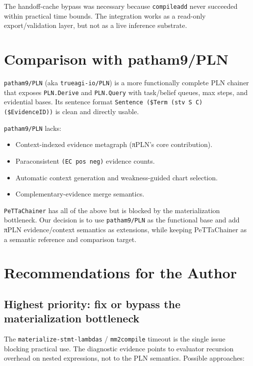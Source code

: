 \documentclass[11pt]{article}
\begin{document}
The handoff-cache bypass was necessary because \texttt{compileadd} never
succeeded within practical time bounds. The integration works as a read-only
export/validation layer, but not as a live inference substrate.


\section{Comparison with patham9/PLN}

\texttt{patham9/PLN} (aka \texttt{trueagi-io/PLN}) is a more functionally complete
PLN chainer that exposes \texttt{PLN.Derive} and \texttt{PLN.Query} with task/belief
queues, max steps, and evidential bases. Its sentence format
\texttt{Sentence (\$Term (stv S C) (\$EvidenceID))} is clean and directly usable.

\texttt{patham9/PLN} lacks:
\begin{itemize}[nosep]
  \item Context-indexed evidence metagraph (πPLN's core contribution).
  \item Paraconsistent \texttt{(EC pos neg)} evidence counts.
  \item Automatic context generation and weakness-guided chart selection.
  \item Complementary-evidence merge semantics.
\end{itemize}

\texttt{PeTTaChainer} has all of the above but is blocked by the materialization
bottleneck. Our decision is to use \texttt{patham9/PLN} as the functional base and
add πPLN evidence/context semantics as extensions, while keeping PeTTaChainer as a
semantic reference and comparison target.


\section{Recommendations for the Author}

\subsection{Highest priority: fix or bypass the materialization bottleneck}

The \texttt{materialize-stmt-lambdas} / \texttt{mm2compile} timeout is the single
issue blocking practical use. The diagnostic evidence points to evaluator
recursion overhead on nested expressions, not to the PLN semantics. Possible
approaches:
\end{document}
